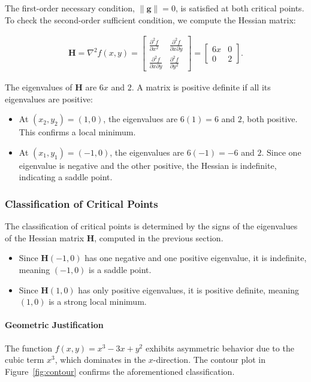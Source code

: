 \documentclass[12pt]{article}
\begin{document}
The first-order necessary condition, \( \|\mathbf{g} \| = 0 \), is satisfied at both critical points. To check the second-order sufficient condition, we compute the Hessian matrix:

\begin{align*}
\mathbf{H} = \nabla^2 f(x,y) = 
\begin{bmatrix}
\frac{\partial^2 f}{\partial x^2} & \frac{\partial^2 f}{\partial x \partial y} \\
\frac{\partial^2 f}{\partial x \partial y} & \frac{\partial^2 f}{\partial y^2}
\end{bmatrix}
=
\begin{bmatrix}
6x & 0 \\
0 & 2
\end{bmatrix}.
\end{align*}

The eigenvalues of \( \mathbf{H} \) are \( 6x \) and \( 2 \). A matrix is positive definite if all its eigenvalues are positive:
\begin{itemize}
    \item At \( (x_2, y_2) = (1, 0) \), the eigenvalues are \( 6(1) = 6 \) and \( 2 \), both positive. This confirms a local minimum.
    \item At \( (x_1, y_1) = (-1, 0) \), the eigenvalues are \( 6(-1) = -6 \) and \( 2 \). Since one eigenvalue is negative and the other positive, the Hessian is indefinite, indicating a saddle point.
\end{itemize}
\subsubsection{Classification of Critical Points}

The classification of critical points is determined by the signs of the eigenvalues of the Hessian matrix \( \mathbf{H} \), computed in the previous section.
\begin{itemize}
    \item Since \( \mathbf{H}(-1,0) \) has one negative and one positive eigenvalue, it is indefinite, meaning \( (-1,0) \) is a saddle point.
    \item Since \( \mathbf{H}(1,0) \) has only positive eigenvalues, it is positive definite, meaning \( (1,0) \) is a strong local minimum.
\end{itemize}


\paragraph{Geometric Justification}
The function \( f(x, y) = x^3 - 3x + y^2 \) exhibits asymmetric behavior due to the cubic term \( x^3 \), which dominates in the \( x \)-direction. The contour plot in Figure~\ref{fig:contour} confirms the aforementioned classification.
\end{document}
